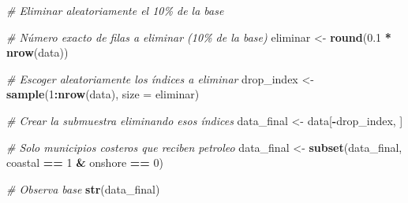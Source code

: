 \documentclass[
]{article}
\newenvironment{Shaded}{\begin{snugshade}}{\end{snugshade}}
\newcommand{\AttributeTok}[1]{\textcolor[rgb]{0.13,0.29,0.53}{#1}}
\newcommand{\CommentTok}[1]{\textcolor[rgb]{0.56,0.35,0.01}{\textit{#1}}}
\newcommand{\DecValTok}[1]{\textcolor[rgb]{0.00,0.00,0.81}{#1}}
\newcommand{\FloatTok}[1]{\textcolor[rgb]{0.00,0.00,0.81}{#1}}
\newcommand{\FunctionTok}[1]{\textcolor[rgb]{0.13,0.29,0.53}{\textbf{#1}}}
\newcommand{\NormalTok}[1]{#1}
\newcommand{\OtherTok}[1]{\textcolor[rgb]{0.56,0.35,0.01}{#1}}
\newcommand{\SpecialCharTok}[1]{\textcolor[rgb]{0.81,0.36,0.00}{\textbf{#1}}}
\begin{document}
\begin{Shaded}
\begin{Highlighting}[]
\CommentTok{\# Eliminar aleatoriamente el 10\% de la base}

\CommentTok{\# Número exacto de filas a eliminar (10\% de la base)}
\NormalTok{eliminar }\OtherTok{\textless{}{-}} \FunctionTok{round}\NormalTok{(}\FloatTok{0.1} \SpecialCharTok{*} \FunctionTok{nrow}\NormalTok{(data))}

\CommentTok{\# Escoger aleatoriamente los índices a eliminar}
\NormalTok{drop\_index }\OtherTok{\textless{}{-}} \FunctionTok{sample}\NormalTok{(}\DecValTok{1}\SpecialCharTok{:}\FunctionTok{nrow}\NormalTok{(data), }\AttributeTok{size =}\NormalTok{ eliminar)}

\CommentTok{\# Crear la submuestra eliminando esos índices}
\NormalTok{data\_final }\OtherTok{\textless{}{-}}\NormalTok{ data[}\SpecialCharTok{{-}}\NormalTok{drop\_index, ]}

\CommentTok{\# Solo municipios costeros que reciben petroleo }
\NormalTok{data\_final }\OtherTok{\textless{}{-}} \FunctionTok{subset}\NormalTok{(data\_final, coastal }\SpecialCharTok{==} \DecValTok{1} \SpecialCharTok{\&}\NormalTok{ onshore }\SpecialCharTok{==} \DecValTok{0}\NormalTok{)}

\CommentTok{\# Observa base}
\FunctionTok{str}\NormalTok{(data\_final)}
\end{Highlighting}
\end{Shaded}
\end{document}
